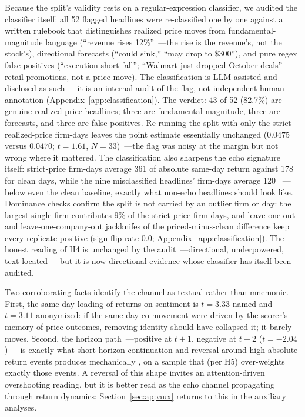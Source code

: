 Because the split's validity rests on a regular-expression classifier, we audited the classifier itself: all 52 flagged headlines were re-classified one by one against a written rulebook that distinguishes realized price moves from fundamental-magnitude language (``revenue rises 12\%''~---the rise is the revenue's, not the stock's), directional forecasts (``could sink,'' ``may drop to \$300''), and pure regex false positives (``execution short fall''; ``Walmart just dropped October deals''~---retail promotions, not a price move). The classification is LLM-assisted and disclosed as such~---it is an internal audit of the flag, not independent human annotation (Appendix~\ref{app:classification}). The verdict: 43 of 52 (82.7\%) are genuine realized-price headlines; three are fundamental-magnitude, three are forecasts, and three are false positives. Re-running the split with only the strict realized-price firm-days leaves the point estimate essentially unchanged ($0.0475$ versus $0.0470$; $t=1.61$, $N=33$)~---the flag was noisy at the margin but not wrong where it mattered. The classification also sharpens the echo signature itself: strict-price firm-days average 361 \bps{} of absolute same-day return against 178 for clean days, while the nine misclassified headlines' firm-days average 120 \bps{}~---below even the clean baseline, exactly what non-echo headlines should look like. Dominance checks confirm the split is not carried by an outlier firm or day: the largest single firm contributes 9\% of the strict-price firm-days, and leave-one-out and leave-one-company-out jackknifes of the priced-minus-clean difference keep every replicate positive (sign-flip rate 0.0; Appendix~\ref{app:classification}). The honest reading of H4 is unchanged by the audit~---directional, underpowered, text-located~---but it is now directional evidence whose classifier has itself been audited.

Two corroborating facts identify the channel as textual rather than mnemonic. First, the same-day loading of returns on sentiment is $t=3.33$ named and $t=3.11$ anonymized: if the same-day co-movement were driven by the scorer's memory of price outcomes, removing identity should have collapsed it; it barely moves. Second, the horizon path~---positive at $t+1$, negative at $t+2$ ($t=-2.04$)~---is exactly what short-horizon continuation-and-reversal around high-absolute-return events produces mechanically \citep{chan2003}, on a sample that (per H5) over-weights exactly those events. A reversal of this shape invites an attention-driven overshooting reading, but it is better read as the echo channel propagating through return dynamics; Section~\ref{sec:appaux} returns to this in the auxiliary analyses.

